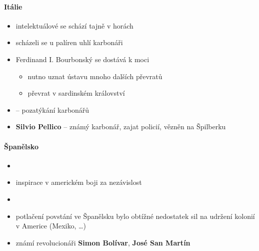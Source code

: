 \paragraph{Itálie}
\begin{itemize}
\item intelektuálové se schází tajně v horách
\item scházeli se u palíren uhlí \ra karbonáři
\item {} \ra Ferdinand I. Bourbonský se dostává k moci
	\begin{itemize}
	\item nutno uznat ústavu \ra mnoho dalších převratů
	\item převrat v sardinském království
	\end{itemize}
\item {} -- pozatýkání karbonářů
\item \textbf{Silvio Pellico} -- známý karbonář, zajat policií, vězněn na Špilberku
\end{itemize}

\paragraph{Španělsko}
\begin{itemize}
\item {}
\item inspirace v americkém boji za nezávislost
\item {}
\item potlačení povstání ve Španělsku bylo obtížné \ra nedostatek sil na udržení kolonií v Americe (Mexiko, \ldots)
\item známí revolucionáři \textbf{Simon Bolívar}, \textbf{José San Martín}
\end{itemize}

